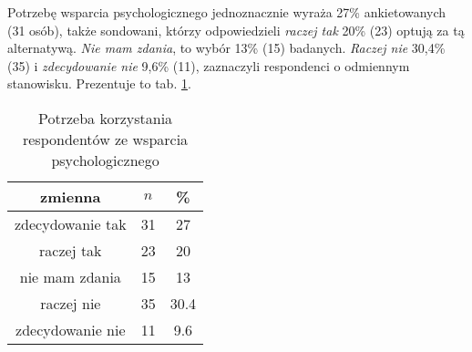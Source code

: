 

 Potrzebę wsparcia psychologicznego jednoznacznie wyraża 27\% ankietowanych (31 osób), także sondowani, którzy odpowiedzieli \textit{raczej tak} 20\% (23) optują za tą alternatywą. \textit{Nie mam zdania}, to wybór 13\% (15) badanych. \textit{Raczej nie} 30,4\% (35) i \textit{zdecydowanie nie} 9,6\% (11), zaznaczyli respondenci o odmiennym stanowisku. Prezentuje to tab. \ref{tab:Q22}.
\begin{table}[H]
\caption{Potrzeba korzystania respondentów ze wsparcia psychologicznego}
\centering
\begin{tabular}{ | c | c | c |}
\hline
zmienna & $n$ & \% \\
\hline
zdecydowanie tak  &  31  & 27 \\
\hline
raczej tak  &  23  & 20 \\
\hline
nie mam zdania  &  15  & 13 \\
\hline
raczej nie  &  35  & 30.4 \\
\hline
zdecydowanie nie  &  11  & 9.6 \\
\hline
\end{tabular}
\label{tab:Q22}
\end{table}
